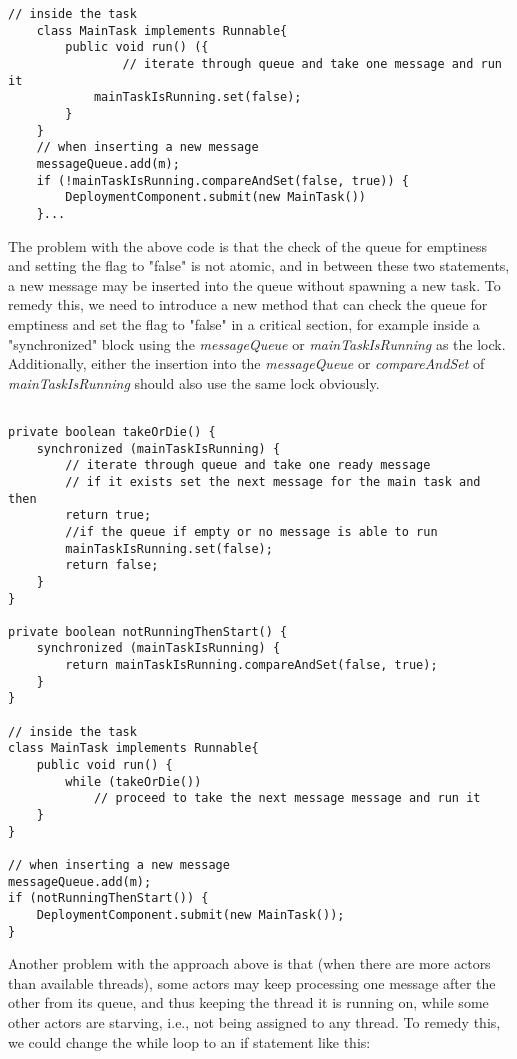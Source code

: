\begin{lstlisting}[caption= Basic Synchronization for the Demand-Driven Approach]
	// inside the task
	class MainTask implements Runnable{
		public void run() ({
				// iterate through queue and take one message and run it
			mainTaskIsRunning.set(false);
		}
	}
	// when inserting a new message
	messageQueue.add(m);
	if (!mainTaskIsRunning.compareAndSet(false, true)) {
		DeploymentComponent.submit(new MainTask())
	}...
\end{lstlisting}

The problem with the above code is that the check of the queue for emptiness and setting the flag to "false" is not atomic, and in between these two statements, a new message may be inserted into the queue without spawning a new task. To remedy this, we need to introduce a new method that can check the queue for emptiness and set the flag to "false" in a critical section, for example inside a "synchronized" block using the \textit{messageQueue} or \textit{mainTaskIsRunning} as the lock. Additionally, either the insertion into the \textit{messageQueue} or \textit{compareAndSet} of \textit{mainTaskIsRunning} should also use the same lock obviously.

\begin{lstlisting}[caption= Complete Synchronization for the Demand-Driven Approach]

private boolean takeOrDie() {
	synchronized (mainTaskIsRunning) {
		// iterate through queue and take one ready message 
		// if it exists set the next message for the main task and then
		return true;
		//if the queue if empty or no message is able to run
		mainTaskIsRunning.set(false);
		return false;
	}
}

private boolean notRunningThenStart() {
	synchronized (mainTaskIsRunning) {
		return mainTaskIsRunning.compareAndSet(false, true);
	}
}

// inside the task
class MainTask implements Runnable{
	public void run() {
		while (takeOrDie())
			// proceed to take the next message message and run it	 
	}
}

// when inserting a new message
messageQueue.add(m);
if (notRunningThenStart()) {
	DeploymentComponent.submit(new MainTask());
}
\end{lstlisting}

Another problem with the approach above is that (when there are more actors than available threads), some actors may keep processing one message after the other from its queue, and thus keeping the thread it is running on, while some other actors are starving, i.e., not being assigned to any thread. To remedy this, we could change the while loop to an if statement like this:

